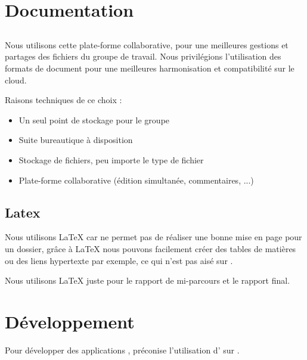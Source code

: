 \section{Documentation}
\subsection{\googleDrive}
Nous utilisons cette plate-forme collaborative, pour une meilleures gestions et partages des fichiers du groupe de travail. Nous privilégions l'utilisation des formats de document \google{} pour une meilleures harmonisation et compatibilité sur le cloud.

Raisons techniques de ce choix :
\begin{itemize}
\item Un seul point de stockage pour le groupe
\item Suite bureautique à disposition
\item Stockage de fichiers, peu importe le type de fichier
\item Plate-forme collaborative (édition simultanée, commentaires, ...)
\end{itemize}

\subsection{Latex}
Nous utilisons \LaTeX{} car \googleDocuments{} ne permet pas de réaliser une bonne mise en page pour un dossier, gr\^{a}ce à \LaTeX{} nous pouvons facilement créer des tables de matières ou des liens hypertexte par exemple, ce qui n'est pas aisé sur \googleDocuments{}.

Nous utilisons \LaTeX{} juste pour le rapport de mi-parcours et le rapport final.

\section{Développement}
Pour développer des applications \android{}, \google{} préconise l'utilisation d'\eclipse{} sur \ubuntu{}.
